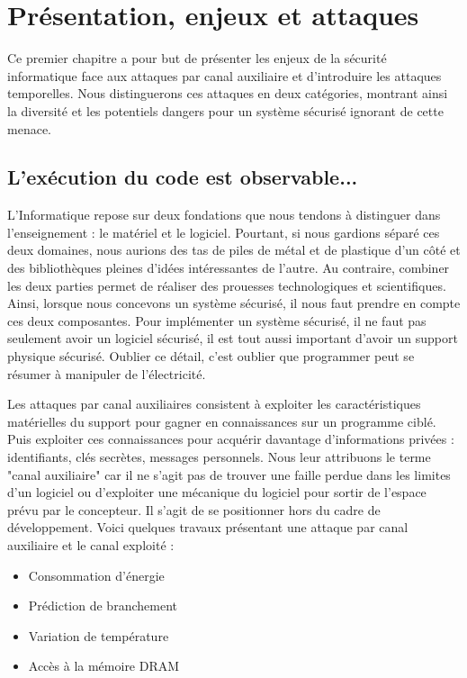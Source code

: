 \chapter{Présentation, enjeux et attaques}
\label{chap:constantTimePresentation}


Ce premier chapitre a pour but de présenter les enjeux de la sécurité informatique face aux attaques par canal auxiliaire et d'introduire les attaques temporelles. Nous distinguerons ces attaques en deux catégories, montrant ainsi la diversité et les potentiels dangers pour un système sécurisé ignorant de cette menace.



\section{L'exécution du code est observable...}

L'Informatique repose sur deux fondations que nous tendons à distinguer dans l'enseignement : le matériel et le logiciel. Pourtant, si nous gardions séparé ces deux domaines, nous aurions des tas de piles de métal et de plastique d'un côté et des bibliothèques pleines d'idées intéressantes de l'autre. Au contraire, combiner les deux parties permet de réaliser des prouesses technologiques et scientifiques. Ainsi, lorsque nous concevons un système sécurisé, il nous faut prendre en compte ces deux composantes. Pour implémenter un système sécurisé, il ne faut pas seulement avoir un logiciel sécurisé, il est tout aussi important d'avoir un support physique sécurisé. Oublier ce détail, c'est oublier que programmer peut se résumer à manipuler de l'électricité.\medbreak

Les attaques par canal auxiliaires consistent à exploiter les caractéristiques matérielles du support pour gagner en connaissances sur un programme ciblé. Puis exploiter ces connaissances pour acquérir davantage d'informations privées : identifiants, clés secrètes, messages personnels. Nous leur attribuons le terme "canal auxiliaire" car il ne s'agit pas de trouver une faille perdue dans les limites d'un logiciel ou d'exploiter une mécanique du logiciel pour sortir de l'espace prévu par le concepteur. Il s'agit de se positionner hors du cadre de développement. Voici quelques travaux présentant une attaque par canal auxiliaire et le canal exploité :
\begin{itemize}
    \item[\cite{DPA_Attack}] Consommation d'énergie %
    \item[\cite{Branch_Attack}] Prédiction de branchement %
    \item[\cite{Thermal_Attack}] Variation de température %
    \item[\cite{DRAM_Attack}] Accès à la mémoire DRAM %
\end{itemize}\medbreak

